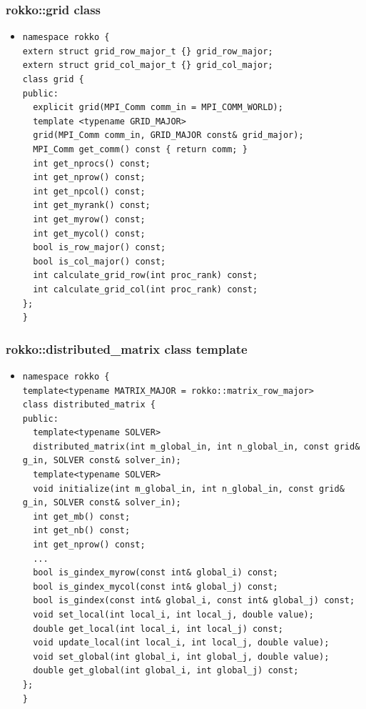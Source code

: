 \begin{frame}[c,fragile]
  \frametitle{rokko::grid class}
  \begin{itemize}
  \item {}
\begin{lstlisting}
namespace rokko {
extern struct grid_row_major_t {} grid_row_major;
extern struct grid_col_major_t {} grid_col_major;
class grid {
public:
  explicit grid(MPI_Comm comm_in = MPI_COMM_WORLD);
  template <typename GRID_MAJOR>
  grid(MPI_Comm comm_in, GRID_MAJOR const& grid_major);
  MPI_Comm get_comm() const { return comm; }
  int get_nprocs() const;
  int get_nprow() const;
  int get_npcol() const;
  int get_myrank() const;
  int get_myrow() const;
  int get_mycol() const;
  bool is_row_major() const;
  bool is_col_major() const;
  int calculate_grid_row(int proc_rank) const;
  int calculate_grid_col(int proc_rank) const;
};
}
\end{lstlisting}
  \end{itemize}
\end{frame}


\begin{frame}[c,fragile]
  \frametitle{rokko::distributed\_matrix class template}
  \begin{itemize}
  \item {}
\begin{lstlisting}
namespace rokko {
template<typename MATRIX_MAJOR = rokko::matrix_row_major>
class distributed_matrix {
public:
  template<typename SOLVER>
  distributed_matrix(int m_global_in, int n_global_in, const grid& g_in, SOLVER const& solver_in);
  template<typename SOLVER>
  void initialize(int m_global_in, int n_global_in, const grid& g_in, SOLVER const& solver_in);
  int get_mb() const;
  int get_nb() const;
  int get_nprow() const;
  ...
  bool is_gindex_myrow(const int& global_i) const;
  bool is_gindex_mycol(const int& global_j) const;
  bool is_gindex(const int& global_i, const int& global_j) const;
  void set_local(int local_i, int local_j, double value);
  double get_local(int local_i, int local_j) const;
  void update_local(int local_i, int local_j, double value);
  void set_global(int global_i, int global_j, double value);
  double get_global(int global_i, int global_j) const;
};
}
\end{lstlisting}
  \end{itemize}
\end{frame}

